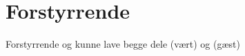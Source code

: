 \section{Forstyrrende}
\label{TestresultaterSocialAcceptForstyrrende}
%
Forstyrrende og kunne lave begge dele (vært) og (gæst)